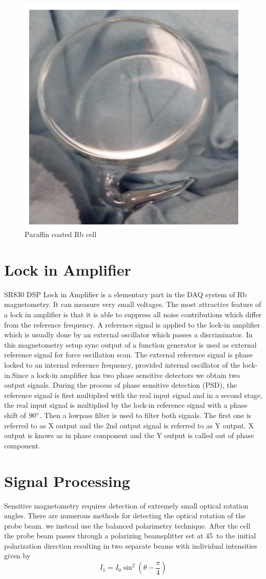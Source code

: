 \begin{figure}[h]
\centering
\includegraphics[width=0.5\linewidth]{figures/cell}
\caption{Paraffin coated Rb cell}
\end{figure}
\section{Lock in Amplifier}
SR830 DSP Lock in Amplifier is a elementary part in the DAQ system of Rb magnetometry. It can measure very  small voltages. The most attractive feature of a lock in amplifier is that it is able to suppress all noise contributions which differ from the reference frequency. A reference signal is applied to the lock-in amplifier which is usually done by an external oscillator which passes a discriminator. In this magnetometry setup sync output of a function generator is used as external reference signal for force oscillation scan. The external reference signal is phase locked to an internal reference frequency, provided internal oscillator of the lock-in.Since a lock-in amplifier has two phase sensitive detectors we obtain two output signals. During the process of phase sensitive detection (PSD), the reference signal is first multiplied with the real input signal  and in a second stage, the real input signal is multiplied by
the lock-in reference signal with a phase shift of $90\degree$. Then a lowpass filter is used to filter both signals. The first one is referred to as X output and the 2nd output signal is referred to as Y output. X output is knows as in phase component and the Y output is called out of phase component.


\section{Signal Processing\label{sec:Signal Processing}}
Sensitive magnetometry requires detection of extremely small optical rotation angles. There are numerous methods for detecting the optical rotation of the probe beam.  we instead use the balanced polarimetry technique.  After the cell the probe beam passes through a polarizing beamsplitter set at 45\degree~to the initial polarization direction resulting in two separate beams with individual intensities given by 
\begin{equation}
I_1 = I_0\sin^2(\theta-\frac{\pi}{4})
\end{equation}

